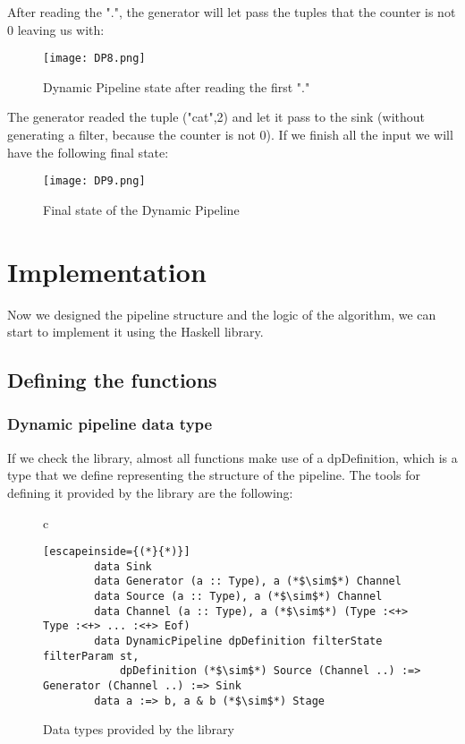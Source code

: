 After reading the ".", the generator will let pass the tuples that the counter is not 0 leaving us with:
\begin{figure}[H]
    \centering
    \texttt{[image: DP8.png]}
    \caption{Dynamic Pipeline state after reading the first "."}
    \label{fig:DP8}
\end{figure}

The generator readed the tuple ("cat",2) and let it pass to the sink (without generating a filter, because the counter is not 0). 
If we finish all the input we will have the following final state:
\begin{figure}[H]
    \centering
    \texttt{[image: DP9.png]}
    \caption{Final state of the Dynamic Pipeline}
    \label{fig:DP9}
\end{figure}
\section{Implementation}
Now we designed the pipeline structure and the logic of the algorithm, we can start to implement it using the Haskell library. 
\subsection{Defining the functions}
\subsubsection{Dynamic pipeline data type}
If we check the library, almost all functions make use of a dpDefinition, which is a type that we define representing the structure of the pipeline. 
The tools for defining it provided by the library are the following:

\begin{figure}[H]
    \centering
    \begin{tabular}{c}
        \begin{lstlisting}[escapeinside={(*}{*)}]
        data Sink
        data Generator (a :: Type), a (*$\sim$*) Channel
        data Source (a :: Type), a (*$\sim$*) Channel
        data Channel (a :: Type), a (*$\sim$*) (Type :<+> Type :<+> ... :<+> Eof)
        data DynamicPipeline dpDefinition filterState filterParam st, 
            dpDefinition (*$\sim$*) Source (Channel ..) :=> Generator (Channel ..) :=> Sink
        data a :=> b, a & b (*$\sim$*) Stage
        \end{lstlisting}
    \end{tabular}
    \caption{Data types provided by the library}
    \label{fig:DP10}
\end{figure}

